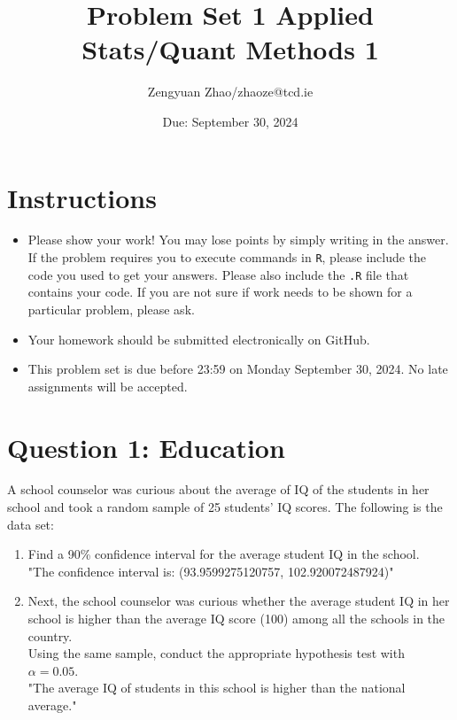 \documentclass[12pt,letterpaper]{article}
\title{Problem Set 1  Applied Stats/Quant Methods 1}
\date{Due: September 30, 2024}
\author{Zengyuan Zhao/zhaoze@tcd.ie}
\begin{document}
	\maketitle
	
	\section*{Instructions}
	\begin{itemize}
	\item Please show your work! You may lose points by simply writing in the answer. If the problem requires you to execute commands in \texttt{R}, please include the code you used to get your answers. Please also include the \texttt{.R} file that contains your code. If you are not sure if work needs to be shown for a particular problem, please ask.
\item Your homework should be submitted electronically on GitHub.
\item This problem set is due before 23:59 on Monday September 30, 2024. No late assignments will be accepted.
	\end{itemize}
	
	\vspace{1cm}
	\section*{Question 1: Education}

A school counselor was curious about the average of IQ of the students in her school and took a random sample of 25 students' IQ scores. The following is the data set:\\
\vspace{.5cm}

  

\vspace{1cm}

\begin{enumerate}
	\item Find a 90\% confidence interval for the average student IQ in the school.\\
	  
"The confidence interval is: (93.9599275120757, 102.920072487924)"\\
	\item Next, the school counselor was curious  whether  the average student IQ in her school is higher than the average IQ score (100) among all the schools in the country.\\ 
	\noindent Using the same sample, conduct the appropriate hypothesis test with $\alpha=0.05$.\\
	
	"The average IQ of students in this school is higher than the national average."\\
\end{enumerate}
\end{document}
